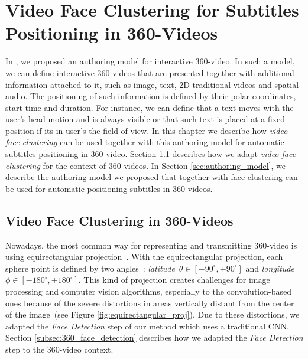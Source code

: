 \newpage
\chapter{Video Face Clustering for Subtitles Positioning in 360-Videos}
\label{chap:subtitles_positioning}

In \cite{mendes2020authoring}, we proposed an authoring model for interactive 360-video. In such a model, we can define interactive 360-videos that are presented together with additional information attached to it, such as image, text, 2D traditional videos and spatial audio. The positioning of such information is defined by their polar coordinates, start time and duration. For instance, we can define that a text moves with the user's head motion and is always visible or that such text is placed at a fixed position if its in user's the field of view. In this chapter we describe how \emph{video face clustering} can be used together with this authoring model for automatic subtitles positioning in 360-video. Section \ref{sec:authoring_clustering_360} describes how we adapt \emph{video face clustering} for the context of 360-videos. In Section \ref{sec:authoring_model}, we describe the authoring model we proposed that together with face clustering can be used for automatic positioning subtitles in 360-videos.
 
\section{Video Face Clustering in 360-Videos}

\label{sec:authoring_clustering_360}

Nowadays, the most common way for representing and transmitting 360-video is using equirectangular projection~\cite{yang2018object}. With the equirectangular projection, each sphere point is defined by two angles~\cite{snyder1987map}: \emph{latitude}~$\theta \in [-90^{\circ}, +90^{\circ}]$ and \emph{longitude}~$\phi \in [-180^{\circ}, +180^{\circ}]$. This kind of projection creates challenges for image processing and computer vision algorithms, especially to the convolution-based ones because of the severe distortions in areas vertically distant from the center of the image~(see Figure \ref{fig:equirectangular_proj}). Due to these distortions, we adapted the \emph{Face Detection} step of our method which uses a traditional CNN. Section \ref{subsec:360_face_detection} describes how we adapted the \emph{Face Detection} step to the 360-video context.

